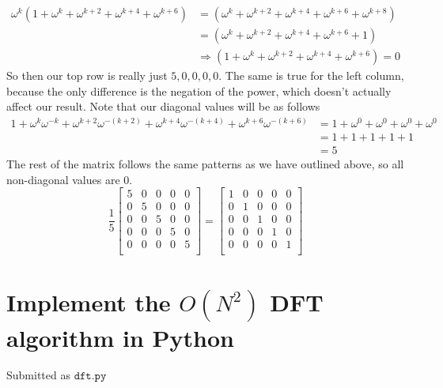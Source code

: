 \documentclass[11pt]{article}
\begin{document}
\begin{itemize}
	\begin{align*}
	\omega^k(1 + \omega^{k} + \omega^{k+2} + \omega^{k+4} + \omega^{k+6}) 
		&= (\omega^k + \omega^{k+2} + \omega^{k+4} + \omega^{k+6} + \omega^{k+8}) \\
		&= (\omega^k + \omega^{k+2} + \omega^{k+4} + \omega^{k+6} + 1) \\
		&\Rightarrow (1 + \omega^{k} + \omega^{k+2} + \omega^{k+4} + \omega^{k+6}) = 0
	\end{align*}
	So then our top row is really just $5, 0, 0, 0, 0$.
	The same is true for the left column, because the only difference is the negation of the power, which doesn't actually affect our result.
	Note that our diagonal values will be as follows
	\begin{align*}
	1 + \omega^k\omega^{-k} + \omega^{k+2}\omega^{-(k+2)} + \omega^{k+4}\omega^{-(k+4)} + \omega^{k+6}\omega^{-(k+6)} 
		&= 1 + \omega^0 + \omega^0 + \omega^0 + \omega^0 \\
		&= 1 + 1 + 1 + 1 + 1 \\
		&= 5
	\end{align*}
	The rest of the matrix follows the same patterns as we have outlined above, so all non-diagonal values are 0. 
	$$
	\frac{1}{5}
	\begin{bmatrix}
		5 & 0 & 0 & 0 & 0 \\
		0 & 5 & 0 & 0 & 0 \\
		0 & 0 & 5 & 0 & 0 \\
		0 & 0 & 0 & 5 & 0 \\
		0 & 0 & 0 & 0 & 5 \\
	\end{bmatrix} 
	= 
	\begin{bmatrix}
		1 & 0 & 0 & 0 & 0 \\
		0 & 1 & 0 & 0 & 0 \\
		0 & 0 & 1 & 0 & 0 \\
		0 & 0 & 0 & 1 & 0 \\
		0 & 0 & 0 & 0 & 1 \\
	\end{bmatrix}
	$$
\end{itemize}


\section{Implement the $O(N^2)$ DFT algorithm in Python}
Submitted as $\texttt{dft.py}$
\end{document}
